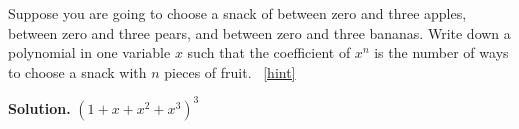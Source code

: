 \documentclass{book}
\begin{document}
\setcounter{project}{241}
\addtocounter{project}{-1}
\begin{activity}[]\label{activity-234}
\hypertarget{p-1336}{}%
Suppose you are going to choose a snack of between zero and three apples, between zero and three pears, and between zero and three bananas. Write down a polynomial in one variable \(x\) such that the coefficient of \(x^n\) is the number of ways to choose a snack with \(n\) pieces of fruit.%
~\hfill{\tiny\hyperlink{a-241}{[hint]}\hypertarget{q-241}{}}\par\smallskip%
\noindent\textbf{Solution.}\hypertarget{solution-176}{}\quad%
\hypertarget{p-1338}{}%
\((1+x+x^2+x^3)^3\)%
\end{activity}
\end{document}
